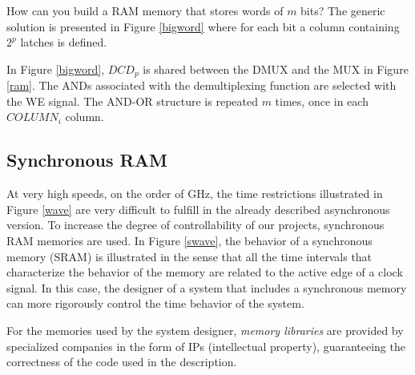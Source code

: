 \textcolor[rgb]{0.00,0.00,0.00}{}


How can you build a RAM memory that stores words of $m$ bits? The generic solution is presented in Figure \ref{bigword} where for each bit a column containing $2^p$ latches is defined.

In Figure \ref{bigword}, $DCD_p$ is shared between the DMUX and the MUX in Figure \ref{ram}. The ANDs associated with the demultiplexing function are selected with the WE signal. The AND-OR structure is repeated $m$ times, once in each $COLUMN_i$ column.

\subsection{Synchronous RAM}\label{syncMem}

At very high speeds, on the order of GHz, the time restrictions illustrated in Figure \ref{wave} are very difficult to fulfill in the already described asynchronous version. To increase the degree of controllability of our projects, synchronous RAM memories are used. In Figure \ref{swave}, the behavior of a synchronous memory (SRAM) is illustrated in the sense that all the time intervals that characterize the behavior of the memory are related to the active edge of a clock signal. In this case, the designer of a system that includes a synchronous memory can more rigorously control the time behavior of the system.

For the memories used by the system designer, {\em memory libraries} are provided by specialized companies in the form of IPs (intellectual property), guaranteeing the correctness of the code used in the description.


